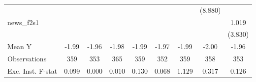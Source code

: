 {\begin{tabular}{l*{8}{c}}
            &                     &                     &                     &                     &                     &                     &     (8.880)         &                     \\
\addlinespace
news\_f2s1   &                     &                     &                     &                     &                     &                     &                     &       1.019         \\
            &                     &                     &                     &                     &                     &                     &                     &     (3.830)         \\
\midrule
Mean Y      &       -1.99         &       -1.96         &       -1.98         &       -1.99         &       -1.97         &       -1.99         &       -2.00         &       -1.96         \\
Observations&         359         &         353         &         365         &         359         &         352         &         359         &         358         &         353         \\
Exc. Inst. F-stat&       0.099         &       0.000         &       0.010         &       0.130         &       0.068         &       1.129         &       0.317         &       0.126         \\
\bottomrule
\end{tabular}
}
